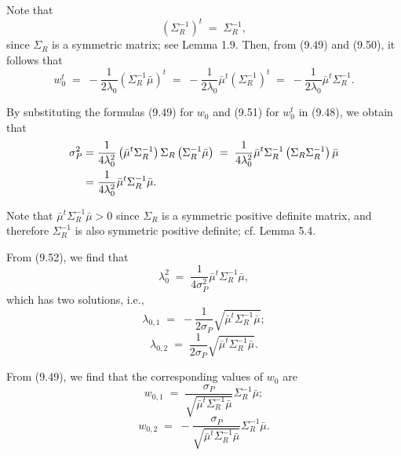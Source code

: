 
Note that
\begin{equation}
\left(\Sigma_R^{-1}\right)^t \;=\; \Sigma_R^{-1},
\end{equation}
since $\Sigma_R$ is a symmetric matrix; see Lemma 1.9. Then, from (9.49) and (9.50),
it follows that
\begin{equation}
w_0^t \;=\; -\frac{1}{2\lambda_0}\left(\Sigma_R^{-1}\bar\mu\right)^t \;=\;
-\frac{1}{2\lambda_0}\bar\mu^t\left(\Sigma_R^{-1}\right)^t \;=\;
-\frac{1}{2\lambda_0}\bar\mu^t\Sigma_R^{-1}.
\end{equation}

By substituting the formulas (9.49) for $w_0$ and (9.51) for $w_0^t$ in (9.48), we
obtain that
\begin{align}
\sigma_P^2 &= \frac{1}{4\lambda_0^2}\left(\bar\mu^t\Sigma_R^{-1}\right)\Sigma_R
\left(\Sigma_R^{-1}\bar\mu\right) \;=\;
\frac{1}{4\lambda_0^2}\bar\mu^t\Sigma_R^{-1}\left(\Sigma_R\Sigma_R^{-1}\right)\bar\mu
\notag\\
&= \frac{1}{4\lambda_0^2}\bar\mu^t\Sigma_R^{-1}\bar\mu.
\end{align}

Note that $\bar\mu^t\Sigma_R^{-1}\bar\mu > 0$ since $\Sigma_R$ is a symmetric positive
definite matrix, and therefore $\Sigma_R^{-1}$ is also symmetric positive definite;
cf. Lemma 5.4.

From (9.52), we find that
\[
\lambda_0^2 \;=\; \frac{1}{4\sigma_P^2}\bar\mu^t\Sigma_R^{-1}\bar\mu,
\]
which has two solutions, i.e.,
\begin{equation}
\lambda_{0,1} \;=\; -\frac{1}{2\sigma_P}\sqrt{\bar\mu^t\Sigma_R^{-1}\bar\mu};
\end{equation}
\begin{equation}
\lambda_{0,2} \;=\; \frac{1}{2\sigma_P}\sqrt{\bar\mu^t\Sigma_R^{-1}\bar\mu}.
\end{equation}

From (9.49), we find that the corresponding values of $w_0$ are
\begin{equation}
w_{0,1} \;=\; \frac{\sigma_P}{\sqrt{\bar\mu^t\Sigma_R^{-1}\bar\mu}}\Sigma_R^{-1}\bar\mu;
\end{equation}
\begin{equation}
w_{0,2} \;=\; -\frac{\sigma_P}{\sqrt{\bar\mu^t\Sigma_R^{-1}\bar\mu}}\Sigma_R^{-1}\bar\mu.
\end{equation}

